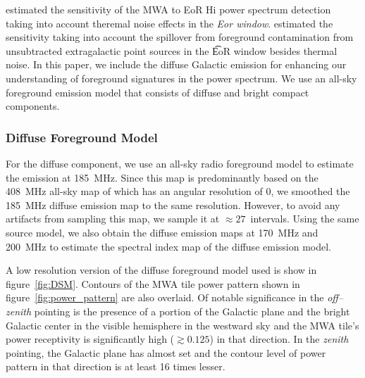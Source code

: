 \documentclass[preprint2,iop,numberedappendix]{emulateapj}
\begin{document}
\citet{bea13} estimated the sensitivity of the MWA to EoR H{\sc i} power spectrum detection taking into account theremal noise effects in the {\it Eor window}. \citet{thy13} estimated the sensitivity taking into account the spillover from foreground contamination from unsubtracted extragalactic point sources in the {\t EoR window} besides thermal noise. In this paper, we include the diffuse Galactic emission for enhancing our understanding of foreground signatures in the power spectrum. We use an all-sky foreground emission model that consists of diffuse and bright compact components. 

\subsubsection{Diffuse Foreground Model}\label{sec:DSM}

For the diffuse component, we use an all-sky radio foreground model \citep{deo08} to estimate the emission at 185~MHz. Since this map is predominantly based on the 408~MHz all-sky map of \citet{has82} which has an angular resolution of 0, we smoothed the 185~MHz diffuse emission map to the same resolution. However, to avoid any artifacts from sampling this map, we sample it at $\approx 27$\arcmin~intervals. Using the same source model, we also obtain the diffuse emission maps at 170~MHz and 200~MHz to estimate the spectral index map of the diffuse emission model. 

A low resolution version of the diffuse foreground model used is show in figure~\ref{fig:DSM}. Contours of the MWA tile power pattern shown in figure~\ref{fig:power_pattern} are also overlaid. Of notable significance in the {\it off--zenith} pointing is the presence of a portion of the Galactic plane and the bright Galactic center in the visible hemisphere in the westward sky and the MWA tile's power receptivity is significantly high ($\gtrsim 0.125$) in that direction. In the {\it zenith} pointing, the Galactic plane has almost set and the contour level of power pattern in that direction is at least 16 times lesser. 
\end{document}
